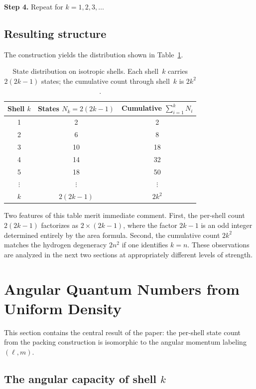 \documentclass[aps,prl,reprint,amsmath,amssymb]{revtex4-2}
\begin{document}
\noindent\textbf{Step 4.}  Repeat for $k = 1, 2, 3, \ldots$

\subsection{Resulting structure}

The construction yields the distribution shown in
Table~\ref{tab:packing}.

\begin{table}[h]
\centering
\begin{tabular}{ccc}
\toprule
Shell $k$ & States $N_k = 2(2k-1)$ & Cumulative $\sum_{i=1}^{k} N_i$ \\
\midrule
1 & 2  & 2  \\
2 & 6  & 8  \\
3 & 10 & 18 \\
4 & 14 & 32 \\
5 & 18 & 50 \\
$\vdots$ & $\vdots$ & $\vdots$ \\
$k$ & $2(2k-1)$ & $2k^2$ \\
\bottomrule
\end{tabular}
\caption{State distribution on isotropic shells.  Each shell~$k$
  carries $2(2k-1)$ states; the cumulative count through shell~$k$ is
  $2k^2$.}
\label{tab:packing}
\end{table}

Two features of this table merit immediate comment.  First, the
per-shell count $2(2k-1)$ factorizes as $2 \times (2k-1)$, where the
factor $2k-1$ is an odd integer determined entirely by the area
formula.  Second, the cumulative count $2k^2$ matches the hydrogen
degeneracy $2n^2$ if one identifies $k = n$.  These observations are
analyzed in the next two sections at appropriately different levels of
strength.


\section{Angular Quantum Numbers from Uniform Density}
\label{sec:angular}

This section contains the central result of the paper: the per-shell
state count from the packing construction is isomorphic to the angular
momentum labeling $(\ell, m)$.

\subsection{The angular capacity of shell $k$}
\end{document}
